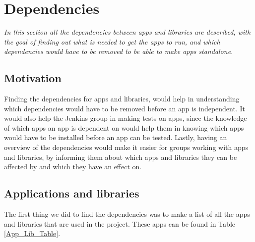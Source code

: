 \section{Dependencies}
\label{Sprint2_SecDependencies}
\textit{In this section all the dependencies between apps and libraries are described, with the goal of finding out what is needed to get the apps to run, and which dependencies would have to be removed to be able to make apps standalone.}

\subsection{Motivation}
Finding the dependencies for apps and libraries, would help in understanding which dependencies would have to be removed before an app is independent. It would also help the Jenkins group in making tests on apps, since the knowledge of which apps an app is dependent on would help them in knowing which apps would have to be installed before an app can be tested. Lastly, having an overview of the dependencies would make it easier for groups working with apps and libraries, by informing them about which apps and libraries they can be affected by and which they have an effect on.

\subsection{Applications and libraries}
The first thing we did to find the dependencies was to make a list of all the apps and libraries that are used in the project. These apps can be found in Table \ref{App_Lib_Table}.

